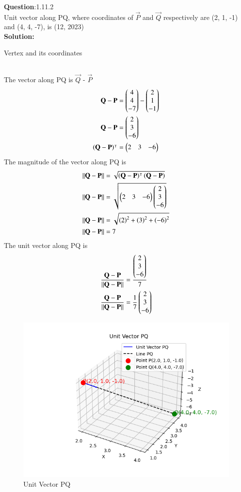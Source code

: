 \documentclass[journal]{IEEEtran}
\begin{document}
\textbf{Question}:1.11.2\\
Unit vector along PQ, where coordinates of $\vec{P}$ and $\vec{Q}$ respectively are (2, 1, -1) and (4, 4, -7), is \hfill(12, 2023)
\\
\textbf{Solution:}
\renewcommand{\tablename}{Table 1.11.2.1}
\begin{table}[h!]
  \centering
  
  \caption{Vertex and its coordinates}
\end{table}
\\
The vector along PQ is $\vec{Q}$ - $\vec{P}$
    \begin{align}
    \mathbf{Q} - \mathbf{P} & = \begin{pmatrix}4 \\ 4 \\ -7\end{pmatrix} - \begin{pmatrix}2 \\ 1 \\ -1\end{pmatrix} \\
    \mathbf{Q} - \mathbf{P} & = \begin{pmatrix}2 \\ 3 \\ -6\end{pmatrix} \\
    \left(\mathbf{Q} - \mathbf{P}\right)^\intercal & = \begin{pmatrix}2 & 3 & -6\end{pmatrix}
 \end{align}
The magnitude of the vector along PQ is
\begin{align}
\left\lVert\mathbf{Q} - \mathbf{P}\right\rVert & = \sqrt{\left(\mathbf{Q} - \mathbf{P}\right)^\intercal\left(\mathbf{Q} - \mathbf{P}\right)} \\
   \left\lVert\mathbf{Q} - \mathbf{P}\right\rVert & = \sqrt{\begin{pmatrix}2 & 3 & -6\end{pmatrix} \begin{pmatrix}2 \\ 3 \\ -6\end{pmatrix}} \\
   \left\lVert\mathbf{Q} - \mathbf{P}\right\rVert & = \sqrt{\left(2\right)^2 + \left(3\right)^2 + \left(-6\right)^2} \\
   \left\lVert\mathbf{Q} - \mathbf{P}\right\rVert & = 7 
\end{align}
The unit vector along PQ is 
\begin{align}
    \frac{\mathbf{Q} - \mathbf{P}}{\left\lVert\mathbf{Q} - \mathbf{P}\right\rVert} & = \frac{\begin{pmatrix}2 \\ 3 \\-6\end{pmatrix}}{7} \\
    \frac{\mathbf{Q} - \mathbf{P}}{\left\lVert\mathbf{Q} - \mathbf{P}\right\rVert} & = \frac{1}{7}\begin{pmatrix}2 \\ 3 \\ -6\end{pmatrix}
\end{align}
\begin{figure}[h!]
   \centering
   \includegraphics[width=0.7\linewidth]{figs/unit.png}
	\caption{Unit Vector PQ}
   \end{figure}
   
\end{document}
